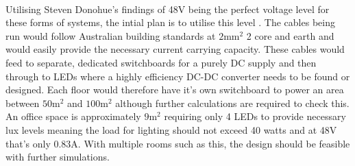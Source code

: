 \paragraph{}
Utilising Steven Donohue's findings of 48V being the perfect voltage level for these forms  of systems, the intial plan is to utilise this level \cite{Donohue2014}. The cables being run would follow Australian building standards at $2\text{mm}^{2}$ 2 core and earth and would easily provide the necessary current carrying capacity. These cables would feed to separate, dedicated switchboards for a purely DC supply and then through to LEDs where a highly efficiency DC-DC converter needs to be found or designed. Each floor would therefore have it's own switchboard to power an area between $50\text{m}^{2}$ and $100\text{m}^{2}$ although further calculations are required to check this. An office space is approximately $9\text{m}^{2}$ requiring only 4 LEDs to provide necessary lux levels meaning the load for lighting should not exceed 40 watts and at 48V that's only 0.83A. With multiple rooms such as this, the design should be feasible with further simulations.    
\newpage